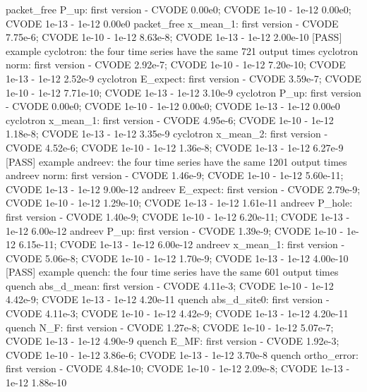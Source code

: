 \documentclass[
  10pt,
]{article}
\newenvironment{Shaded}{}{}
\newcommand{\NormalTok}[1]{#1}
\begin{document}
\begin{Shaded}
\begin{Highlighting}[]
\NormalTok{  packet\_free P\_up: first version {-} CVODE 0.00e0; CVODE 1e{-}10 {-} 1e{-}12 0.00e0; CVODE 1e{-}13 {-} 1e{-}12 0.00e0}
\NormalTok{  packet\_free x\_mean\_1: first version {-} CVODE 7.75e{-}6; CVODE 1e{-}10 {-} 1e{-}12 8.63e{-}8; CVODE 1e{-}13 {-} 1e{-}12 2.00e{-}10}
\NormalTok{[PASS] example cyclotron: the four time series have the same 721 output times}
\NormalTok{  cyclotron norm: first version {-} CVODE 2.92e{-}7; CVODE 1e{-}10 {-} 1e{-}12 7.20e{-}10; CVODE 1e{-}13 {-} 1e{-}12 2.52e{-}9}
\NormalTok{  cyclotron E\_expect: first version {-} CVODE 3.59e{-}7; CVODE 1e{-}10 {-} 1e{-}12 7.71e{-}10; CVODE 1e{-}13 {-} 1e{-}12 3.10e{-}9}
\NormalTok{  cyclotron P\_up: first version {-} CVODE 0.00e0; CVODE 1e{-}10 {-} 1e{-}12 0.00e0; CVODE 1e{-}13 {-} 1e{-}12 0.00e0}
\NormalTok{  cyclotron x\_mean\_1: first version {-} CVODE 4.95e{-}6; CVODE 1e{-}10 {-} 1e{-}12 1.18e{-}8; CVODE 1e{-}13 {-} 1e{-}12 3.35e{-}9}
\NormalTok{  cyclotron x\_mean\_2: first version {-} CVODE 4.52e{-}6; CVODE 1e{-}10 {-} 1e{-}12 1.36e{-}8; CVODE 1e{-}13 {-} 1e{-}12 6.27e{-}9}
\NormalTok{[PASS] example andreev: the four time series have the same 1201 output times}
\NormalTok{  andreev norm: first version {-} CVODE 1.46e{-}9; CVODE 1e{-}10 {-} 1e{-}12 5.60e{-}11; CVODE 1e{-}13 {-} 1e{-}12 9.00e{-}12}
\NormalTok{  andreev E\_expect: first version {-} CVODE 2.79e{-}9; CVODE 1e{-}10 {-} 1e{-}12 1.29e{-}10; CVODE 1e{-}13 {-} 1e{-}12 1.61e{-}11}
\NormalTok{  andreev P\_hole: first version {-} CVODE 1.40e{-}9; CVODE 1e{-}10 {-} 1e{-}12 6.20e{-}11; CVODE 1e{-}13 {-} 1e{-}12 6.00e{-}12}
\NormalTok{  andreev P\_up: first version {-} CVODE 1.39e{-}9; CVODE 1e{-}10 {-} 1e{-}12 6.15e{-}11; CVODE 1e{-}13 {-} 1e{-}12 6.00e{-}12}
\NormalTok{  andreev x\_mean\_1: first version {-} CVODE 5.06e{-}8; CVODE 1e{-}10 {-} 1e{-}12 1.70e{-}9; CVODE 1e{-}13 {-} 1e{-}12 4.00e{-}10}
\NormalTok{[PASS] example quench: the four time series have the same 601 output times}
\NormalTok{  quench abs\_d\_mean: first version {-} CVODE 4.11e{-}3; CVODE 1e{-}10 {-} 1e{-}12 4.42e{-}9; CVODE 1e{-}13 {-} 1e{-}12 4.20e{-}11}
\NormalTok{  quench abs\_d\_site0: first version {-} CVODE 4.11e{-}3; CVODE 1e{-}10 {-} 1e{-}12 4.42e{-}9; CVODE 1e{-}13 {-} 1e{-}12 4.20e{-}11}
\NormalTok{  quench N\_F: first version {-} CVODE 1.27e{-}8; CVODE 1e{-}10 {-} 1e{-}12 5.07e{-}7; CVODE 1e{-}13 {-} 1e{-}12 4.90e{-}9}
\NormalTok{  quench E\_MF: first version {-} CVODE 1.92e{-}3; CVODE 1e{-}10 {-} 1e{-}12 3.86e{-}6; CVODE 1e{-}13 {-} 1e{-}12 3.70e{-}8}
\NormalTok{  quench ortho\_error: first version {-} CVODE 4.84e{-}10; CVODE 1e{-}10 {-} 1e{-}12 2.09e{-}8; CVODE 1e{-}13 {-} 1e{-}12 1.88e{-}10}

\end{Highlighting}
\end{Shaded}
\end{document}
